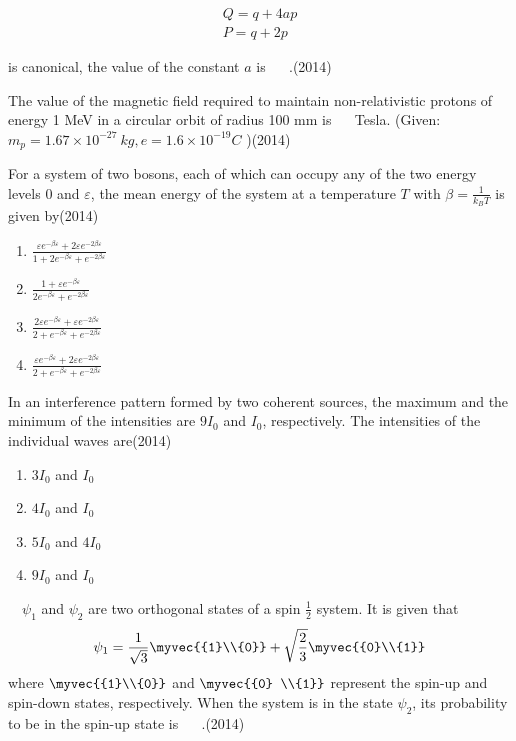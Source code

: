 \begin{align*}
Q=q+4 a p \\
P=q+2 p
\end{align*}

is canonical, the value of the constant $a$ is $\quad$ .\hfill{(2014)}

  \item The value of the magnetic field required to maintain non-relativistic protons of energy 1 MeV in a circular orbit of radius 100 mm is $\quad$ Tesla.
(Given: $m_{p}=1.67 \times 10^{-27} {~kg}, e=1.6 \times 10^{-19} {C}$ )\hfill{(2014)}

\item  For a system of two bosons, each of which can occupy any of the two energy levels 0 and $\varepsilon$, the mean energy of the system at a temperature $T$ with $\beta=\frac{1}{k_{B} T}$ is given by\hfill{(2014)}
 \begin{multicols}{4}
			\begin{enumerate}
   
 
   \item$\frac{\varepsilon e^{-\beta \varepsilon}+2 \varepsilon e^{-2 \beta \varepsilon}}{1+2 e^{-\beta \varepsilon}+e^{-2 \beta \varepsilon}}$
\item  $\frac{1+\varepsilon e^{-\beta \varepsilon}}{2 e^{-\beta \varepsilon}+e^{-2 \beta \varepsilon}}$
\item  $\frac{2 \varepsilon e^{-\beta \varepsilon}+\varepsilon e^{-2 \beta \varepsilon}}{2+e^{-\beta \varepsilon}+e^{-2 \beta \varepsilon}}$
\item $\frac{\varepsilon e^{-\beta \varepsilon}+2 \varepsilon e^{-2 \beta \varepsilon}}{2+e^{-\beta \varepsilon}+e^{-2 \beta \varepsilon}}$
 \end{enumerate}
	\end{multicols}
  \item In an interference pattern formed by two coherent sources, the maximum and the minimum of the intensities are $9 I_{0}$ and $I_{0}$, respectively. The intensities of the individual waves are\hfill{(2014)}
  

\begin{multicols}{4}
			\begin{enumerate}
   \item $3 I_{0}$ and $I_{0}$
\item  $4 I_{0}$ and $I_{0}$
\item $5 I_{0}$ and $4 I_{0}$
\item $9 I_{0}$ and $I_{0}$
\end{enumerate}
		\end{multicols}
  \item  $\quad \psi_{1}$ and $\psi_{2}$ are two orthogonal states of a spin $\frac{1}{2}$ system. It is given that
$$
\psi_{1}=\frac{1}{\sqrt{3}}\myvec{{1}\\{0}}+\sqrt{\frac{2}{3}}\myvec{{0}\\{1}}
$$
where $\myvec{{1}\\{0}}$ and $\myvec{{0} \\{1}}$ represent the spin-up and spin-down states, respectively. When the system is in the state $\psi_{2}$, its probability to be in the spin-up state is $\quad$ .\hfill{(2014)}
 
			
		
 
